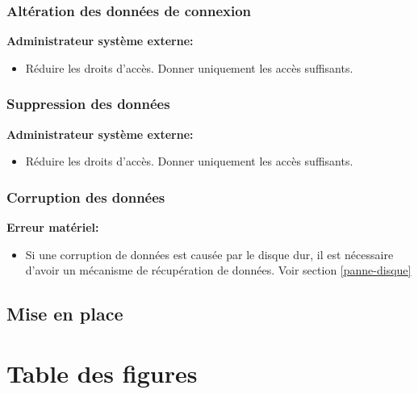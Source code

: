 \documentclass[12pt]{article}
\begin{document}
\subsubsection{Altération des données de connexion}
\hspace{16pt}\textbf{Administrateur système externe:}
\justify
\begin{itemize}
	\item Réduire les droits d'accès. Donner uniquement les accès suffisants.
\end{itemize}


\subsubsection{Suppression des données}
\justify
\hspace{16pt}\textbf{Administrateur système externe:}
\begin{itemize}
	\item Réduire les droits d'accès. Donner uniquement les accès suffisants.
\end{itemize}

\subsubsection{Corruption des données}
\hspace{16pt}\textbf{Erreur matériel:} 
\justify
\begin{itemize}
	\item Si une corruption de données est causée par le disque dur, il est nécessaire d'avoir un mécanisme de récupération de données. Voir section \ref{panne-disque}
\end{itemize}

\newpage
\subsection{Mise en place}

\newpage


\section*{Table des figures}
\makeatletter
{}%
\makeatother
{}%

\end{document}
